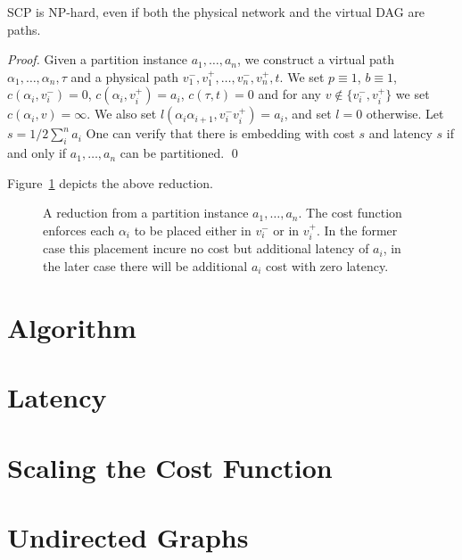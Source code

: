 \documentclass[runningheads]{llncs}
\newcommand{\scp}{\textsc{SCP}\xspace}
\begin{document}
\begin{theorem}
\scp is NP-hard, even if both the physical network and the virtual DAG
are paths.
\end{theorem}
\begin{proof}
 
Given a partition instance $a_1, \ldots, a_n$, we construct a virtual path
$\alpha_1, \ldots, \alpha_n, \tau$ and a physical path 
$v_1^-, v_1^+, \ldots, v_n^-, v_n^+, t$.
We set $p \equiv 1$, $b \equiv 1$, 
$c(\alpha_i, v_i^-) = 0$, $c(\alpha_i, v_i^+) = a_i$, $c(\tau, t) = 0$
and for any $v \notin \{v_i^-,v_i^+\}$ we set $c(\alpha_i, v) = \infty$.
We also set $l(\alpha_i\alpha_{i+1}, v_i^-v_i^+) = a_i$, and set $l = 0$
otherwise.
Let $s = 1/2\sum_i^n a_i$
One can verify that there is embedding with cost $s$ and latency $s$ 
if and only if $a_1, \ldots, a_n$ can be partitioned.
\qed
\end{proof}
Figure~\ref{fig:reduction2} depicts the above reduction.
\begin{figure}[ht]
\centering
\scalebox{.9}{

}
\caption[]{
\label{fig:reduction2}
A reduction from a partition instance $a_1, \ldots, a_n$.
The cost function enforces each $\alpha_i$ to be placed either 
in $v_i^-$ or in $v_i^+$.
In the former case this placement incure no cost but additional latency of $a_i$,
in the later case there will be additional $a_i$ cost with zero latency.
}
\end{figure}



\section{Algorithm}
\label{sec:alg1}




\section{Latency}
\label{sec:alg2}


\section{Scaling the Cost Function}


\section{Undirected Graphs}




\end{document}
